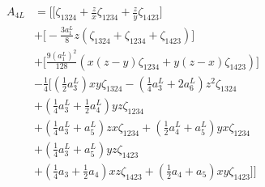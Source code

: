\begin{equation}\begin{split}
A_{4L} &= \bigg[
\Big[\zeta_{1324}+\frac{z}{x}\zeta_{1234}+\frac{z}{y}\zeta_{1423}\Big]
\\&+\Big[-\frac{3a^L_1}{8}z(\zeta_{1324}+\zeta_{1234}+\zeta_{1423})\Big]
\\&+\Big[\frac{9(a^L_1)^2}{128}(x(z-y)\zeta_{1234}+y(z-x)\zeta_{1423})\Big]\\&
-\frac14\Big[(\frac12a^L_3)xy\zeta_{1324}-(\frac14a_3^L+2a_6^L)z^2\zeta_{1324}
\\&+(\frac14a^L_3 +\frac12a^L_4)yz\zeta_{1234} \\& + (\frac14a^L_3 + a^L_5)zx\zeta_{1234}+(\frac12a_4^L+a_5^L)yx\zeta_{1234}
\\&+(\frac14a^L_3 +a_5^L)yz\zeta_{1423}\\&+(\frac14a_3+\frac12a_4)xz\zeta_{1423}+(\frac12a_4+a_5)xy\zeta_{1423}\Big]\bigg]
\end{split}\end{equation}

